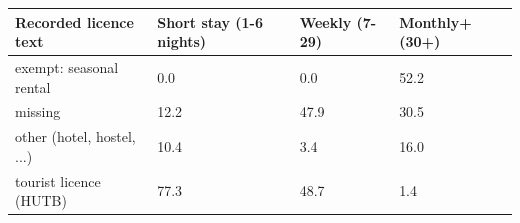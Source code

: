 \begin{tabular}{llll}
\toprule
Recorded licence text & Short stay (1-6 nights) & Weekly (7-29) & Monthly+ (30+) \\
\midrule
exempt: seasonal rental & 0.0 & 0.0 & 52.2 \\
missing & 12.2 & 47.9 & 30.5 \\
other (hotel, hostel, ...) & 10.4 & 3.4 & 16.0 \\
tourist licence (HUTB) & 77.3 & 48.7 & 1.4 \\
\bottomrule
\end{tabular}
